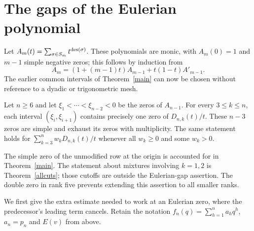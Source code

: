 \section{The gaps of the Eulerian polynomial}
Let $A_m(t)=\sum_{\sigma\in S_m}t^{\operatorname{des}(\sigma)}$.
These polynomials are monic, with $A_m(0)=1$ and $m-1$ simple negative zeros; this follows by induction from
\[
 A_m=(1+(m-1)t)A_{m-1}+t(1-t)A'_{m-1}.
\]
The earlier common intervals of Theorem~\ref{main} can now be chosen without reference to a dyadic or trigonometric mesh.

\begin{theorem}\label{gapthm}
Let $n\ge6$ and let $\xi_1<\cdots<\xi_{n-2}<0$ be the zeros of $A_{n-1}$.
For every $3\le k\le n$, each interval $(\xi_i,\xi_{i+1})$ contains precisely one zero of $D_{n,k}(t)/t$.
These $n-3$ zeros are simple and exhaust its zeros with multiplicity.
The same statement holds for $\sum_{k=3}^n w_kD_{n,k}(t)/t$ whenever all $w_k\ge0$ and some $w_k>0$.
\end{theorem}
The simple zero of the unmodified row at the origin is accounted for in Theorem~\ref{main}. The statement about mixtures involving $k=1,2$ is Theorem~\ref{allcuts}; those cutoffs are outside the Eulerian-gap assertion. The double zero in rank five prevents extending this assertion to all smaller ranks.

We first give the extra estimate needed to work at an Eulerian zero, where the predecessor's leading term cancels.
Retain the notation $f_n(q)=\sum_{h=1}^n a_hq^h$, $a_n=p_n$ and $E(v)$ from above.

